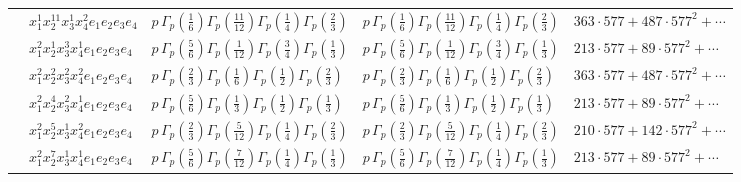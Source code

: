 \documentclass[11pt]{article}
\begin{document}
\begin{table}[ht]
{\begin{tabular}{@{}lllll@{}}
 & $x_{1}^{1} x_{2}^{11} x_{3}^{1} x_{4}^{2}  e_{1} e_{2} e_{3} e_{4}$ & $p \, \Gamma_p \left( \frac{1}{6} \right) \Gamma_p \left( \frac{11}{12} \right) \Gamma_p \left( \frac{1}{4} \right) \Gamma_p \left( \frac{2}{3} \right)$ & $p \, \Gamma_p \left( \frac{1}{6} \right) \Gamma_p \left( \frac{11}{12} \right) \Gamma_p \left( \frac{1}{4} \right) \Gamma_p \left( \frac{2}{3} \right)$ & $363{\cdot}577{+}487{\cdot}577^{2}{+}\cdots$ \\
 & $x_{1}^{2} x_{2}^{1} x_{3}^{3} x_{4}^{1}  e_{1} e_{2} e_{3} e_{4}$ & $p \, \Gamma_p \left( \frac{5}{6} \right) \Gamma_p \left( \frac{1}{12} \right) \Gamma_p \left( \frac{3}{4} \right) \Gamma_p \left( \frac{1}{3} \right)$ & $p \, \Gamma_p \left( \frac{5}{6} \right) \Gamma_p \left( \frac{1}{12} \right) \Gamma_p \left( \frac{3}{4} \right) \Gamma_p \left( \frac{1}{3} \right)$ & $213{\cdot}577{+}89{\cdot}577^{2}{+}\cdots$ \\
 & $x_{1}^{2} x_{2}^{2} x_{3}^{2} x_{4}^{2}  e_{1} e_{2} e_{3} e_{4}$ & $p \, \Gamma_p \left( \frac{2}{3} \right) \Gamma_p \left( \frac{1}{6} \right) \Gamma_p \left( \frac{1}{2} \right) \Gamma_p \left( \frac{2}{3} \right)$ & $p \, \Gamma_p \left( \frac{2}{3} \right) \Gamma_p \left( \frac{1}{6} \right) \Gamma_p \left( \frac{1}{2} \right) \Gamma_p \left( \frac{2}{3} \right)$ & $363{\cdot}577{+}487{\cdot}577^{2}{+}\cdots$ \\
 & $x_{1}^{2} x_{2}^{4} x_{3}^{2} x_{4}^{1}  e_{1} e_{2} e_{3} e_{4}$ & $p \, \Gamma_p \left( \frac{5}{6} \right) \Gamma_p \left( \frac{1}{3} \right) \Gamma_p \left( \frac{1}{2} \right) \Gamma_p \left( \frac{1}{3} \right)$ & $p \, \Gamma_p \left( \frac{5}{6} \right) \Gamma_p \left( \frac{1}{3} \right) \Gamma_p \left( \frac{1}{2} \right) \Gamma_p \left( \frac{1}{3} \right)$ & $213{\cdot}577{+}89{\cdot}577^{2}{+}\cdots$ \\
 & $x_{1}^{2} x_{2}^{5} x_{3}^{1} x_{4}^{2}  e_{1} e_{2} e_{3} e_{4}$ & $p \, \Gamma_p \left( \frac{2}{3} \right) \Gamma_p \left( \frac{5}{12} \right) \Gamma_p \left( \frac{1}{4} \right) \Gamma_p \left( \frac{2}{3} \right)$ & $p \, \Gamma_p \left( \frac{2}{3} \right) \Gamma_p \left( \frac{5}{12} \right) \Gamma_p \left( \frac{1}{4} \right) \Gamma_p \left( \frac{2}{3} \right)$ & $210{\cdot}577{+}142{\cdot}577^{2}{+}\cdots$ \\
 & $x_{1}^{2} x_{2}^{7} x_{3}^{1} x_{4}^{1}  e_{1} e_{2} e_{3} e_{4}$ & $p \, \Gamma_p \left( \frac{5}{6} \right) \Gamma_p \left( \frac{7}{12} \right) \Gamma_p \left( \frac{1}{4} \right) \Gamma_p \left( \frac{1}{3} \right)$ & $p \, \Gamma_p \left( \frac{5}{6} \right) \Gamma_p \left( \frac{7}{12} \right) \Gamma_p \left( \frac{1}{4} \right) \Gamma_p \left( \frac{1}{3} \right)$ & $213{\cdot}577{+}89{\cdot}577^{2}{+}\cdots$ \\

\end{tabular}}
\end{table}
\end{document}
